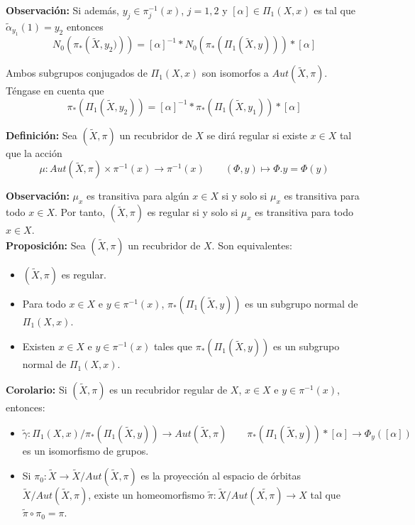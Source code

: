 \documentclass{article}
\begin{document}
\textbf{Observación:} Si además, $y_j\in \pi_j^{-1}(x)$, $j=1,2$ y $[\alpha]\in \Pi_1(X,x)$ es tal que $\tilde{\alpha}_{y_1}(1)=y_2$ entonces
\begin{equation*}
N_0\left(\pi_*\left(\tilde{X},y_2)\right)\right)=[\alpha]^{-1}*N_0\left(\pi_*\left(\Pi_1(\tilde{X},y)\right)\right)*[\alpha]
\end{equation*}

Ambos subgrupos conjugados de $\Pi_1(X,x)$ son isomorfos a $Aut(\tilde{X},\pi)$. Téngase en cuenta que 
\begin{equation*}
\pi_*\left(\Pi_1(\tilde{X},y_2)\right)=[\alpha]^{-1}*\pi_*(\Pi_1(\tilde{X},y_1))*[\alpha]
\end{equation*}

\textbf{Definición:}
Sea $(\tilde{X},\pi)$ un recubridor de $X$ se dirá regular si existe $x\in X$ tal que la acción
\begin{equation*}
\mu:Aut(\tilde{X},\pi)\times \pi^{-1}(x)\rightarrow \pi^{-1}(x)\qquad (\Phi,y)\mapsto \Phi.y=\Phi(y)
\end{equation*}

\textbf{Observación:} $\mu_x$ es transitiva para algún $x\in X$ si y solo si $\mu_x$ es transitiva para todo $x\in X$. Por tanto, $(\tilde{X},\pi)$ es regular si y solo si $\mu_x$ es transitiva para todo $x\in X$. \\

\textbf{Proposición:} Sea $(\tilde{X},\pi)$ un recubridor de $X$. Son equivalentes:
\begin{itemize}
\item $(\tilde{X},\pi)$ es regular.

\item Para todo $x\in X$ e $y\in \pi^{-1}(x)$, $\pi_*(\Pi_1(\tilde{X},y))$ es un subgrupo normal de $\Pi_1(X,x)$.

\item Existen $x\in X$ e $y\in \pi^{-1}(x)$ tales que $\pi_*(\Pi_1(\tilde{X},y))$ es un subgrupo normal de $\Pi_1(X,x)$.
\end{itemize}

\textbf{Corolario:} Si $(\tilde{X},\pi)$ es un recubridor regular de $X$, $x\in X$ e $y\in \pi^{-1}(x)$, entonces:
\begin{itemize}
\item $\tilde{\gamma}:\Pi_1(X,x)/\pi_*(\Pi_1(\tilde{X},y))\rightarrow Aut(\tilde{X},\pi)\qquad \pi_*(\Pi_1(\tilde{X},y))*[\alpha]\rightarrow \Phi_y([\alpha])$ es un isomorfismo de grupos.

\item Si $\pi_0:\tilde{X}\rightarrow \tilde{X}/Aut(\tilde{X},\pi)$ es la proyección al espacio de órbitas $\tilde{X}/Aut(\tilde{X},\pi)$, existe un homeomorfismo $\tilde{\pi}:\tilde{X}/Aut(\tilde{X,\pi})\rightarrow X$ tal que $\tilde{\pi}\circ \pi_0=\pi$.
\end{itemize}
\end{document}
